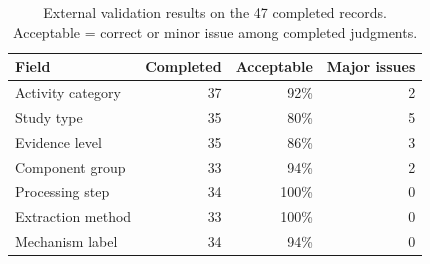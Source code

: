 \begin{table}[t]
\centering
\small
\caption{External validation results on the 47 completed records. Acceptable = correct or minor issue among completed judgments.}
\label{tab:validation_results}
\begin{tabular}{lrrr}
\toprule
Field & Completed & Acceptable & Major issues \\
\midrule
Activity category & 37 & 92\% & 2 \\
Study type & 35 & 80\% & 5 \\
Evidence level & 35 & 86\% & 3 \\
Component group & 33 & 94\% & 2 \\
Processing step & 34 & 100\% & 0 \\
Extraction method & 33 & 100\% & 0 \\
Mechanism label & 34 & 94\% & 0 \\
\bottomrule
\end{tabular}
\end{table}
